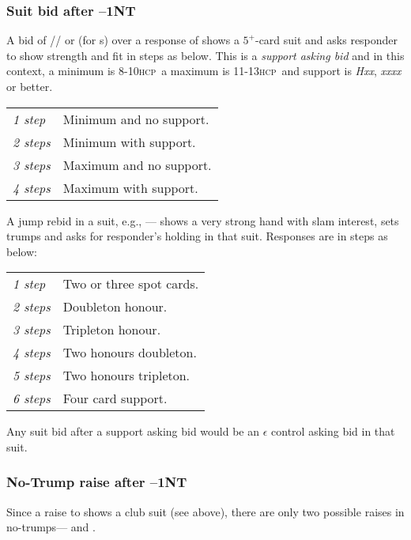\documentclass[a4paper,article,oneside]{memoir}
\newcommand{\hcp}{\textsc{hcp}}
\begin{document}
\subsubsection{Suit bid after --1NT}

A bid of /\he{}/\sp{} or  (for \cl{}s) over a
response of  shows a $5^+$-card suit and asks responder to show
strength and fit in steps as below. This is a \emph{support asking
  bid} and in this context, a minimum is 8-10\hcp\, a maximum is
11-13\hcp\ and support is \emph{Hxx}, \emph{xxxx} or better.

\begin{longtable}{p{1.5cm}p{9.5cm}}
  \hline
  \emph{1 step} & Minimum and no support. \\
  \emph{2 steps} & Minimum with support. \\
  \emph{3 steps} & Maximum and no support. \\
  \emph{4 steps} & Maximum with support. \\
  \hline
\end{longtable}

A jump rebid in a suit, e.g., ---- shows a very
strong hand with slam interest, sets trumps and asks for responder's
holding in that suit.  Responses are in steps as below:

\begin{longtable}{ p{1.5cm}p{9.5cm}}
  \hline
  \emph{1 step} & Two or three spot cards. \\
  \emph{2 steps} & Doubleton honour. \\
  \emph{3 steps} & Tripleton honour. \\
  \emph{4 steps} & Two honours doubleton. \\
  \emph{5 steps} & Two honours tripleton. \\
  \emph{6 steps} & Four card support. \\
  \hline
\end{longtable}

Any suit bid after a support asking bid would be an $\epsilon$ control
asking bid in that suit.\hyperlink{epsilon}{\HandCuffRight}

\subsubsection{No-Trump raise after --1NT}


Since a raise to  shows a club suit (see above), there are only
two possible raises in no-trumps--- and .
\end{document}
